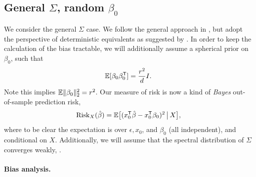 \documentclass{article}
\begin{document}
\subsection{General $\Sigma$, random $\beta_0$}

We consider the general $\Sigma$ case. We follow the general approach in
\citet{dobriban2018high}, but adopt the perspective of deterministic equivalents
as suggested by \citet{dobriban2021distributed}. In order to keep the
calculation of the bias tractable, we will additionally assume a spherical prior  
on $\beta_0$, such that      
\begin{equation}
\label{eq:prior}
\mathbb{E}[\beta_0 \beta_0^{\mathsf{T}}] = \frac{r^2}{d} I.
\end{equation}
Note this implies $\mathbb{E} \|\beta_0\|_2^2 = r^2$. Our measure of risk is now a kind
of \emph{Bayes} out-of-sample prediction risk,  
\begin{equation}
\label{eq:ridge_risk_bayes}
\mathrm{Risk}_X(\hat{\beta}) = \mathbb{E} \big[ ( x_0^{\mathsf{T}} \hat{\beta} - x_0^{\mathsf{T}} \beta_0 )^2 \,\big|\,
X \big],
\end{equation}
where to be clear the expectation is over $\epsilon, x_0$, and $\beta_0$ (all
independent), and conditional on $X$. Additionally, we will assume that the
spectral distribution of $\Sigma$ converges weakly,  .

\paragraph{Bias analysis.}
\end{document}

